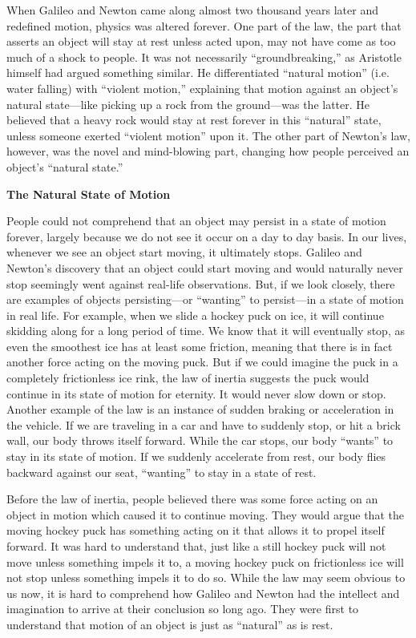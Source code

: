 When Galileo and Newton came along almost two thousand years later and redefined motion, physics was altered forever. One part of the law, the part that asserts an object will stay at rest unless acted upon, may not have come as too much of a shock to people. It was not necessarily “groundbreaking,” as Aristotle himself had argued something similar. He differentiated “natural motion” (i.e. water falling) with “violent motion,” explaining that motion against an object’s natural state—like picking up a rock from the ground—was the latter. He believed that a heavy rock would stay at rest forever in this “natural” state, unless someone exerted “violent motion” upon it. The other part of Newton’s law, however, was the novel and mind-blowing part, changing how people perceived an object’s “natural state.”

\noindent
\textbf{The Natural State of Motion}

People could not comprehend that an object may persist in a state of motion forever, largely because we do not see it occur on a day to day basis. In our lives, whenever we see an object start moving, it ultimately stops. Galileo and Newton’s discovery that an object could start moving and would naturally never stop seemingly went against real-life observations. But, if we look closely, there are examples of objects persisting—or “wanting” to persist—in a state of motion in real life. For example, when we slide a hockey puck on ice, it will continue skidding along for a long period of time. We know that it will eventually stop, as even the smoothest ice has at least some friction, meaning that there is in fact another force acting on the moving puck. But if we could imagine the puck in a completely frictionless ice rink, the law of inertia suggests the puck would continue in its state of motion for eternity. It would never slow down or stop. Another example of the law is an instance of sudden braking or acceleration in the vehicle. If we are traveling in a car and have to suddenly stop, or hit a brick wall, our body throws itself forward. While the car stops, our body “wants” to stay in its state of motion. If we suddenly accelerate from rest, our body flies backward against our seat, “wanting” to stay in a state of rest.

Before the law of inertia, people believed there was some force acting on an object in motion which caused it to continue moving. They would argue that the moving hockey puck has something acting on it that allows it to propel itself forward. It was hard to understand that, just like a still hockey puck will not move unless something impels it to, a moving hockey puck on frictionless ice will not stop unless something impels it to do so. While the law may seem obvious to us now, it is hard to comprehend how Galileo and Newton had the intellect and imagination to arrive at their conclusion so long ago. They were first to understand that motion of an object is just as “natural” as is rest.
